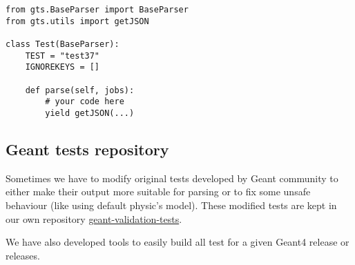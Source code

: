 \begin{verbatim}
from gts.BaseParser import BaseParser
from gts.utils import getJSON

class Test(BaseParser):
    TEST = "test37"
    IGNOREKEYS = []

    def parse(self, jobs):
        # your code here
        yield getJSON(...)
\end{verbatim}


\subsection{Geant tests repository}
\label{sec-geant-validation-tests}

Sometimes we have to modify original tests developed by Geant community to either make their output more suitable for parsing or to fix some unsafe behaviour (like using  default physic's model). These modified tests are kept in our own repository \href{https://gitlab.cern.ch/GeantValidation/geant-validation-tests}{geant-validation-tests}.

We have also developed tools to easily build all test for a given Geant4 release or releases.
